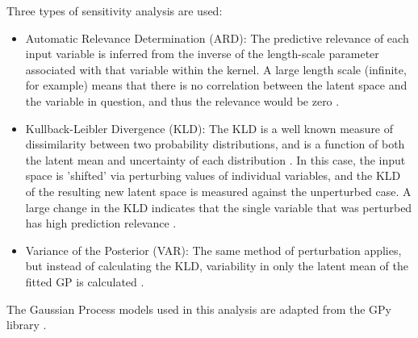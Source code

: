 \documentclass[a4paper, twoside, final, 12pt]{article}
\begin{document}
Three types of sensitivity analysis are used:
\begin{itemize}
	\item Automatic Relevance Determination (ARD): The predictive relevance of each input variable is inferred from the inverse of the length-scale parameter associated with that variable within the kernel. A large length scale (infinite, for example) means that there is no correlation between the latent space and the variable in question, and thus the relevance would be zero \cite{pmlr-v89-paananen19a}. 
	\item Kullback-Leibler Divergence (KLD): The KLD is a well known measure of dissimilarity between two probability distributions, and is a function of both the latent mean and uncertainty of each distribution \cite{KLD}. In this case, the input space is 'shifted' via perturbing values of individual variables, and the KLD of the resulting new latent space is measured against the unperturbed case. A large change in the KLD indicates that the single variable that was perturbed has high prediction relevance \cite{pmlr-v89-paananen19a}. 
	\item Variance of the Posterior (VAR): The same method of perturbation applies, but instead of calculating the KLD, variability in  only the latent mean of the fitted GP is calculated \cite{pmlr-v89-paananen19a}.
\end{itemize}

The Gaussian Process models used in this analysis are adapted from the GPy library \cite{gpy2014}. 
\end{document}
